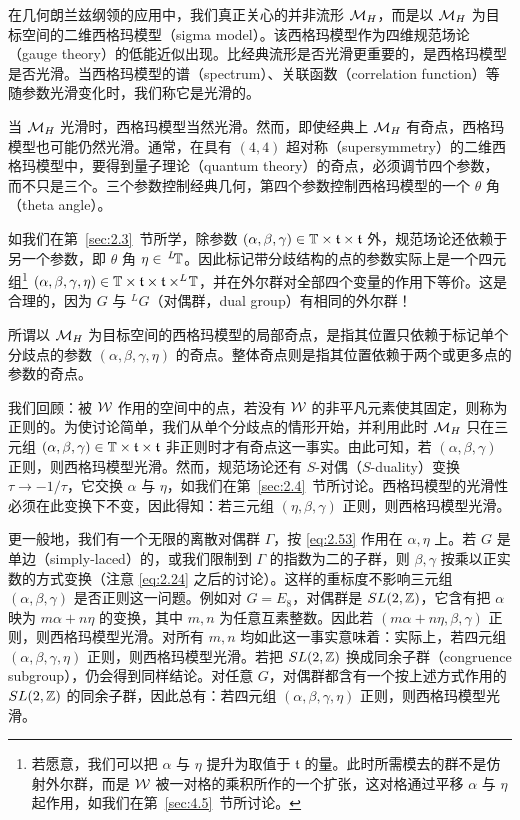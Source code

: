 \bigskip{}

在几何朗兰兹纲领的应用中，我们真正关心的并非流形 ${{\mathcal{M}}_H}$，而是以 ${{\mathcal{M}}_H}$ 为目标空间的二维西格玛模型（sigma model）。该西格玛模型作为四维规范场论（gauge theory）的低能近似出现。比经典流形是否光滑更重要的，是西格玛模型是否光滑。当西格玛模型的谱（spectrum）、关联函数（correlation function）等随参数光滑变化时，我们称它是光滑的。

当 ${{\mathcal{M}}_H}$ 光滑时，西格玛模型当然光滑。然而，即使经典上 ${{\mathcal{M}}_H}$ 有奇点，西格玛模型也可能仍然光滑。通常，在具有 $(4,4)$ 超对称（supersymmetry）的二维西格玛模型中，要得到量子理论（quantum theory）的奇点，必须调节四个参数，而不只是三个。三个参数控制经典几何，第四个参数控制西格玛模型的一个 $\theta$ 角（theta angle）。

如我们在第~\ref{sec:2.3}~节所学，除参数 $(\alpha,\beta,\gamma) \in {\mathbb{T}}\times \mathfrak t\times \mathfrak t$ 外，规范场论还依赖于另一个参数，即 $\theta$ 角 $\eta\in \,^L\negthinspace{\mathbb{T}}$。因此标记带分歧结构的点的参数实际上是一个四元组\footnote{若愿意，我们可以把 $\alpha$ 与 $\eta$ 提升为取值于 $\mathfrak t$ 的量。此时所需模去的群不是仿射外尔群，而是 ${\mathcal W}$ 被一对格的乘积所作的一个扩张，这对格通过平移 $\alpha$ 与 $\eta$ 起作用，如我们在第~\ref{sec:4.5}~节所讨论。} $(\alpha,\beta,\gamma,\eta)\in {\mathbb{T}}\times \mathfrak t\times \mathfrak t\times ^L\negthinspace{\mathbb{T}}$，并在外尔群对全部四个变量的作用下等价。这是合理的，因为 $G$ 与 $^LG$（对偶群，dual group）有相同的外尔群！

所谓以 ${{\mathcal{M}}_H}$ 为目标空间的西格玛模型的局部奇点，是指其位置只依赖于标记单个分歧点的参数 $(\alpha,\beta,\gamma,\eta)$ 的奇点。整体奇点则是指其位置依赖于两个或更多点的参数的奇点。

我们回顾：被 ${\mathcal W}$ 作用的空间中的点，若没有 ${\mathcal W}$ 的非平凡元素使其固定，则称为正则的。为使讨论简单，我们从单个分歧点的情形开始，并利用此时 ${{\mathcal{M}}_H}$ 只在三元组 $(\alpha,\beta,\gamma)\in {\mathbb{T}}\times\mathfrak t\times \mathfrak t$ 非正则时才有奇点这一事实。由此可知，若 $(\alpha,\beta,\gamma)$ 正则，则西格玛模型光滑。然而，规范场论还有 $S$-对偶（$S$-duality）变换 $\tau\to -1/\tau$，它交换 $\alpha$ 与 $\eta$，如我们在第~\ref{sec:2.4}~节所讨论。西格玛模型的光滑性必须在此变换下不变，因此得知：若三元组 $(\eta,\beta,\gamma)$ 正则，则西格玛模型光滑。

更一般地，我们有一个无限的离散对偶群 $\Gamma$，按 \eqref{eq:2.53} 作用在 $\alpha,\eta$ 上。若 $G$ 是单边（simply-laced）的，或我们限制到 $\Gamma$ 的指数为二的子群，则 $\beta,\gamma$ 按乘以正实数的方式变换（注意 \eqref{eq:2.24} 之后的讨论）。这样的重标度不影响三元组 $(\alpha,\beta,\gamma)$ 是否正则这一问题。例如对 $G=E_8$，对偶群是 $SL(2,{\mathbb{Z}})$，它含有把 $\alpha$ 映为 $m\alpha+n\eta$ 的变换，其中 $m,n$ 为任意互素整数。因此若 $(m\alpha+n\eta,\beta,\gamma)$ 正则，则西格玛模型光滑。对所有 $m,n$ 均如此这一事实意味着：实际上，若四元组 $(\alpha,\beta,\gamma,\eta)$ 正则，则西格玛模型光滑。若把 $SL(2,{\mathbb{Z}})$ 换成同余子群（congruence subgroup），仍会得到同样结论。对任意 $G$，对偶群都含有一个按上述方式作用的 $SL(2,{\mathbb{Z}})$ 的同余子群，因此总有：若四元组 $(\alpha,\beta,\gamma,\eta)$ 正则，则西格玛模型光滑。

